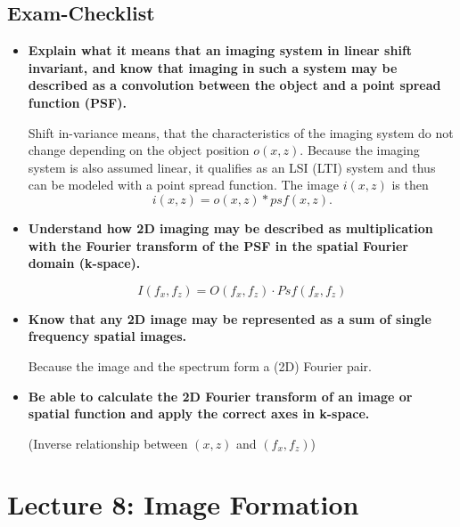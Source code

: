 \documentclass[10pt,a4paper,noendnumber=true]{scrartcl}
\begin{document}
\subsection{Exam-Checklist}
\begin{itemize}
\item \textbf{Explain what it means that an imaging system in linear shift invariant, and know that imaging in such a system may be described as a convolution between the object and a point spread function (PSF).}

Shift in-variance means, that the characteristics of the imaging system do not change depending on the object position $o(x,z)$. Because the imaging system is also assumed linear, it qualifies as an LSI (LTI) system and thus can be modeled with a point spread function. The image $i(x,z)$ is then
\begin{equation}
i(x,z) = o(x,z) \ast psf(x,z).
\end{equation}

\item \textbf{Understand how 2D imaging may be described as multiplication with the Fourier transform of the PSF in the spatial Fourier domain (k-space).}

\begin{equation}
I(f_x,f_z) = O(f_x,f_z) \cdot Psf(f_x,f_z)
\end{equation}

\item \textbf{Know that any 2D image may be represented as a sum of single frequency spatial images.}

Because the image and the spectrum form a (2D) Fourier pair.

\item \textbf{Be able to calculate the 2D Fourier transform of an image or spatial function and apply the correct axes in k-space.}

(Inverse relationship between $(x,z)$ and $(f_x,f_z)$)

\end{itemize}

\newpage
\section{Lecture 8: Image Formation}
\end{document}
